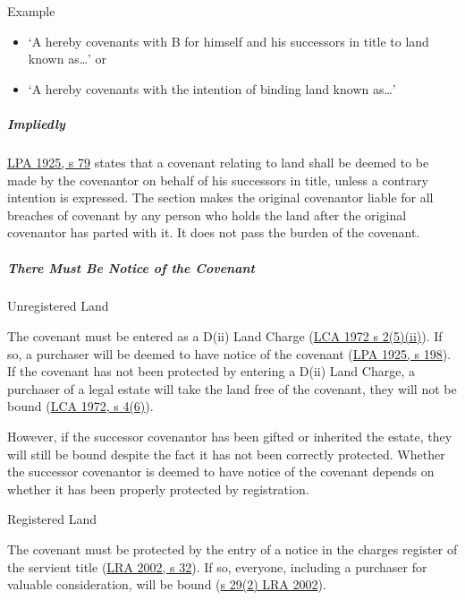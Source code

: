 \documentclass[
]{article}
\providecommand{\tightlist}{%
  \setlength{\itemsep}{0pt}\setlength{\parskip}{0pt}}
\newenvironment{env-de3101d4-f08b-48eb-bc0e-2fa06f3bcf8e}
{
    \savenotes\tcolorbox[blanker,breakable,left=5pt,borderline west={2pt}{-4pt}{purple}]
}
{
    \endtcolorbox\spewnotes
}
\begin{document}
\begin{env-de3101d4-f08b-48eb-bc0e-2fa06f3bcf8e}

Example

\begin{itemize}
\tightlist
\item
  `A hereby covenants with B for himself and his successors in title to
  land known as\ldots' or
\item
  `A hereby covenants with the intention of binding land known as\ldots'
\end{itemize}

\end{env-de3101d4-f08b-48eb-bc0e-2fa06f3bcf8e}

\hypertarget{impliedly}{%
\subparagraph{Impliedly}\label{impliedly}}

\href{https://www.legislation.gov.uk/ukpga/Geo5/15-16/20/section/79}{LPA
1925, s 79} states that a covenant relating to land shall be deemed to
be made by the covenantor on behalf of his successors in title, unless a
contrary intention is expressed. The section makes the original
covenantor liable for all breaches of covenant by any person who holds
the land after the original covenantor has parted with it. It does not
pass the burden of the covenant.

\hypertarget{there-must-be-notice-of-the-covenant}{%
\subparagraph{There Must Be Notice of the
Covenant}\label{there-must-be-notice-of-the-covenant}}

Unregistered Land

The covenant must be entered as a D(ii) Land Charge
(\href{https://www.legislation.gov.uk/ukpga/1972/61/section/2}{LCA 1972
s 2(5)(ii)}). If so, a purchaser will be deemed to have notice of the
covenant
(\href{https://www.legislation.gov.uk/ukpga/Geo5/15-16/20/section/198}{LPA
1925, s 198}). If the covenant has not been protected by entering a
D(ii) Land Charge, a purchaser of a legal estate will take the land free
of the covenant, they will not be bound
(\href{https://www.legislation.gov.uk/ukpga/1972/61/section/4}{LCA 1972,
s 4(6)}).

However, if the successor covenantor has been gifted or inherited the
estate, they will still be bound despite the fact it has not been
correctly protected. Whether the successor covenantor is deemed to have
notice of the covenant depends on whether it has been properly protected
by registration.

Registered Land

The covenant must be protected by the entry of a notice in the charges
register of the servient title
(\href{https://www.legislation.gov.uk/ukpga/2002/9/section/32}{LRA 2002,
s 32}). If so, everyone, including a purchaser for valuable
consideration, will be bound
(\href{https://www.legislation.gov.uk/ukpga/2002/9/section/29}{s 29(2)
LRA 2002}).
\end{document}
